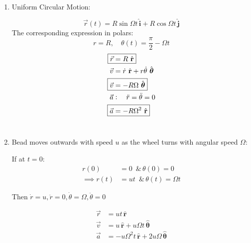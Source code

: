 \documentclass[twoside]{scrartcl}
\let\oldhat\hat
\renewcommand{\hat}[1]{\,\oldhat{\boldsymbol{\mathbf{#1}}}}
\begin{document}
\begin{examples}
\begin{enumerate}
  \item Uniform Circular Motion:
  
  \[\vec{r}(t) = R\sin\Omega t\hat{i} + R\cos\Omega t \hat{j}\]
  The corresponding expression in polars:
  \[r = R,\quad \theta(t) = \frac{\pi}{2} - \Omega t\]
  \[
\begin{aligned}
  \Aboxed{\vec{r} &= R\hat{r}}\\
  \vec{v} &= \dot{r}\hat{r} + r\dot{\theta}\hat{\theta}\\
  \Aboxed{\vec{v} &= -R\Omega\hat{\theta}}\\
  \vec{a} &: \quad \ddot{r} = \ddot{\theta} = 0\\
  \Aboxed{\vec{a} &= -R\Omega^2\hat{r}}
\end{aligned}
\]~\\

\item Bead moves outwards with speed $u$ as the wheel turns with angular speed $\Omega$:
\begin{center}
\end{center}

If at $t=0$:
\[\begin{aligned}
r(0) &= 0 \,\text{ \& }\, \theta(0) = 0\\
\implies r(t) &= ut \,\text{ \& }\, \theta(t) = \Omega t	
\end{aligned}
\]

Then $\dot{r} = u, \ddot{r} = 0, \dot{\theta} = \Omega, \ddot{\theta} = 0$

\[
\begin{aligned}
  \vec{r} &= ut\hat{r}\\
  \vec{v} &= u\hat{r} + u\Omega t\hat{\theta}\\
  \vec{a} &= -u\Omega^2t\hat{r} + 2u\Omega\hat{\theta}
\end{aligned}
\]
\end{enumerate}
\end{examples}
\end{document}
